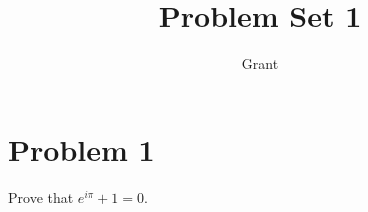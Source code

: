 \documentclass{article}
\title{Problem Set 1}
\author{Grant}
\begin{document}
\maketitle

\section{Problem 1}
Prove that $e^{i\pi} + 1 = 0$.
\end{document}
